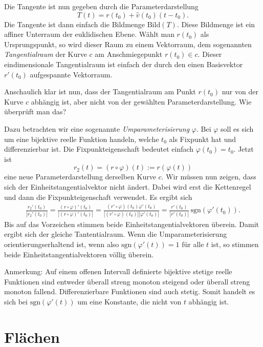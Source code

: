\documentclass[a4paper,12pt,fleqn]{article}
\begin{document}
Die Tangente ist nun gegeben durch die Parameterdarstellung
\begin{equation}
T(t) = r(t_0)+\hat v(t_0)(t-t_0).
\end{equation}
Die Tangente ist dann einfach die Bildmenge $\mathrm{Bild}(T)$.
Diese Bildmenge ist ein affiner Unterraum der euklidischen
Ebene. Wählt man $r(t_0)$ als Ursprungspunkt, so wird dieser Raum
zu einem Vektorraum, dem sogenannten \textit{Tangentialraum} der
Kurve $c$ am Anschmiegepunkt $r(t_0)\in c$. Dieser
eindimensionale Tangentialraum ist einfach der durch den
einen Basisvektor $r'(t_0)$ aufgespannte Vektorraum.

Anschaulich klar ist nun, dass der Tangentialraum am Punkt $r(t_0)$
nur von der Kurve $c$ abhängig ist, aber nicht von der gewählten
Parameterdarstellung. Wie überprüft man das?

Dazu betrachten wir eine sogenannte \textit{Umparameterisierung}
$\varphi$. Bei $\varphi$ soll es sich um eine bijektive
reelle Funktion handeln, welche $t_0$ als Fixpunkt hat und
differenzierbar ist. Die Fixpunkteigenschaft bedeutet einfach
$\varphi(t_0)=t_0$. Jetzt ist
\begin{equation}
r_2(t) = (r\circ\varphi)(t):=r(\varphi(t))
\end{equation}
eine neue Parameterdarstellung derselben Kurve $c$.
Wir müssen nun zeigen, dass sich der Einheitstangentialvektor
nicht ändert. Dabei wird erst die Kettenregel und dann die
Fixpunkteigenschaft verwendet. Es ergibt sich
\begin{gather*}
\frac{r_2'(t_0)}{|r_2'(t_0)|}
= \frac{(r\circ\varphi)'(t_0)}{|(r\circ\varphi)'(t_0)|}
= \frac{(r'\circ\varphi)(t_0)\varphi'(t_0)}{|(r'\circ\varphi)(t_0)||\varphi'(t_0)|}
= \frac{r'(t_0)}{|r'(t_0)|}\,\mathrm{sgn}(\varphi'(t_0)).
\end{gather*}
Bis auf das Vorzeichen stimmen beide Einheitstangentialvektoren
überein. Damit ergibt sich der gleiche Tantentialraum. Wenn die
Umparameterisierung orientierungserhaltend ist, wenn also
$\mathrm{sgn}(\varphi'(t))=1$ für alle $t$ ist, so stimmen
beide Einheitstangentialvektoren völlig überein.

Anmerkung: Auf einem offenen Intervall definierte bijektive
stetige reelle
Funktionen sind entweder überall streng monoton steigend oder überall
streng monoton fallend. Differenzierbare Funktionen sind auch stetig.
Somit handelt es sich bei $\mathrm{sgn}(\varphi'(t))$ um eine
Konstante, die nicht von $t$ abhängig ist.

\section{Flächen}
\end{document}
